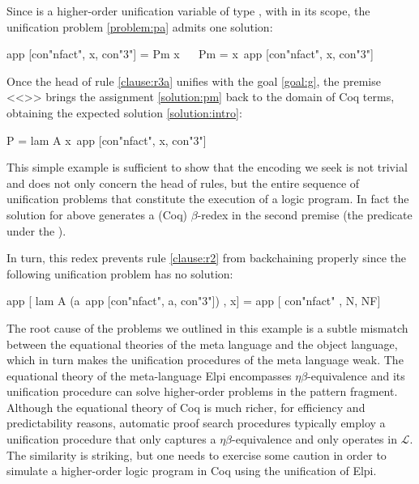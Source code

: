 \documentclass[sigconf,natbib=false,review]{acmart}
\newcommand{\llambda}{\ensuremath{\mathcal{L}}\xspace}
\begin{document}
\noindent
Since  is a higher-order unification variable
of type ,
with 
in its scope, the unification problem \ref{problem:pa}
admits one solution:

\begin{elpicode}
app [con"nfact", x, con"3"] = Pm x                    ~~
Pm = x\ app [con"nfact", x, con"3"]                   ~~
\end{elpicode}

\noindent
Once the head of rule \ref{clause:r3a} unifies with the goal \ref{goal:g},
the premise <<>> brings the assignment \ref{solution:pm}
back to the domain  of Coq terms, obtaining the expected solution
\ref{solution:intro}:

\begin{elpicode}
P = lam A x\ app [con"nfact", x, con"3"]
\end{elpicode}

\noindent
This simple example is sufficient to show that the encoding we seek
is not trivial and does not only concern the head of rules, but the entire sequence
of unification problems that constitute the execution of a logic program.
In fact
the solution for  above generates a
(Coq) $\beta$-redex in the second premise (the predicate
under the \hspace{-0.4em}).


In turn, this redex prevents rule \ref{clause:r2} from backchaining properly since
the following unification problem has no solution:

\begin{elpicode}
app [ lam A (a\ app [con"nfact", a, con"3"]) , x] =
app [ con"nfact"                             , N, NF]
\end{elpicode}

\noindent
The root cause of the problems we outlined in this example
is a subtle mismatch between the equational theories of the meta language
and the object language, which in turn makes the 
unification procedures of the meta language weak.
The equational theory of the meta-language Elpi encompasses
$\eta\beta$-equivalence and its unification procedure can solve higher-order
problems in the pattern fragment. Although 
the equational theory of Coq is much richer, for efficiency and predictability
reasons, automatic proof search procedures typically employ a unification
procedure that only captures a $\eta\beta$-equivalence and only operates
in \llambda. The similarity is striking, but one needs to exercise some caution in order to
simulate a higher-order logic program in Coq using the unification of Elpi.
\end{document}
